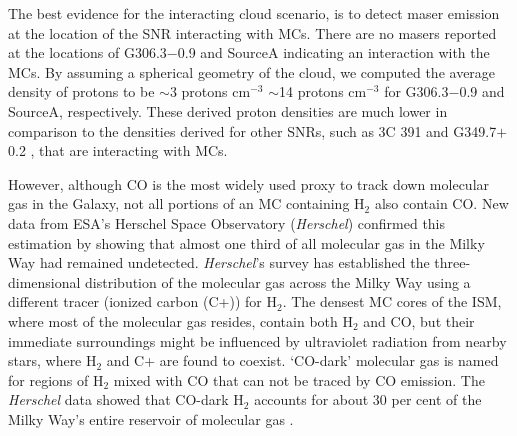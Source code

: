 \documentclass[useAMS,usenatbib]{mn2e}
\begin{document}
The best evidence for the interacting cloud scenario, is to detect maser emission at the location of the SNR interacting with MCs. There are no masers reported at the locations of G306.3$-$0.9 and SourceA indicating an interaction with the MCs. By assuming a spherical geometry of the cloud, we computed the average density of protons to be $\sim$3 protons cm$^{-3}$ $\sim$14 protons cm$^{-3}$ for G306.3$-$0.9 and SourceA, respectively. These derived proton densities are much lower in comparison to the densities derived for other SNRs, such as 3C 391 and G349.7$+$0.2 \citep{Er14, Er15}, that are interacting with MCs.

However, although CO is the most widely used proxy to track down molecular gas in the Galaxy, not all portions of an MC containing H$_2$ also contain CO. New data from ESA's Herschel Space Observatory ({\it Herschel}) \citep{Pi13} confirmed this estimation by showing that almost one third of all molecular gas in the Milky Way had remained undetected. {\it Herschel}'s survey has established the three-dimensional distribution of the molecular gas across the Milky Way using a different tracer (ionized carbon (C+)) for H$_2$. The densest MC cores of the ISM, where most of the molecular gas resides, contain both H$_2$ and CO, but their immediate surroundings might be influenced by ultraviolet radiation from nearby stars, where H$_2$ and C+ are found to coexist.  `CO-dark' molecular gas is named for regions of H$_2$ mixed with CO that can not be traced by CO emission. The {\it Herschel} data showed that CO-dark H$_2$ accounts for about 30 per cent of the Milky Way's entire reservoir of molecular gas \citep{Pi13}. 
\end{document}
